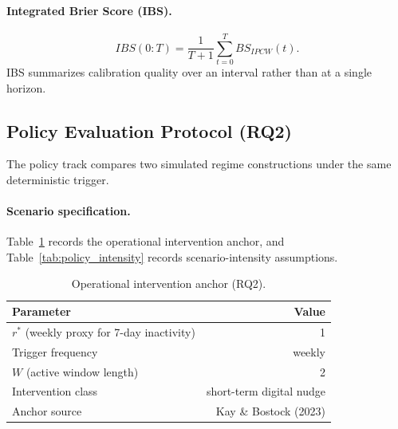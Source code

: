\paragraph*{Integrated Brier Score (IBS).}
\begin{equation*}
IBS(0{:}T)=\frac{1}{T+1}\sum_{t=0}^{T}BS_{IPCW}(t).
\end{equation*}
IBS summarizes calibration quality over an interval rather than at a single horizon.

\subsection{Policy Evaluation Protocol (RQ2)}
\label{subsec:policy_eval}

The policy track compares two simulated regime constructions under the same deterministic trigger.

\paragraph*{Scenario specification.}
Table~\ref{tab:policy_spec} records the operational intervention anchor, and Table~\ref{tab:policy_intensity} records scenario-intensity assumptions.

\begin{table}[!t]
\centering
\caption{Operational intervention anchor (RQ2).}
\label{tab:policy_spec}
\begin{tabular}{lr}
\hline
Parameter & Value \\
\hline
$r^*$ (weekly proxy for 7-day inactivity) & 1 \\
Trigger frequency & weekly \\
$W$ (active window length) & 2 \\
Intervention class & short-term digital nudge \\
Anchor source & Kay \& Bostock (2023) \\
\hline
\end{tabular}
\end{table}

